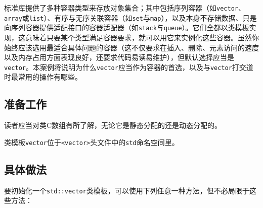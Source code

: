 
标准库提供了多种容器类型来存放对象集合；其中包括序列容器（如\texttt{vector}、\texttt{array}或\texttt{list}）、有序与无序关联容器（如\texttt{set}与\texttt{map}），以及本身不存储数据、只是向序列容器提供适配接口的容器适配器（如\texttt{stack}与\texttt{queue}）。它们全都以类模板实现，这意味着只要某个类型满足容器要求，就可以用它来实例化这些容器。虽然你始终应该选用最适合具体问题的容器（这不仅要求在插入、删除、元素访问的速度以及内存占用方面表现良好，还要求代码易读易维护），但默认选择应当是\texttt{vector}。本案例将说明为什么\texttt{vector}应当作为容器的首选，以及与\texttt{vector}打交道时最常用的操作有哪些。



\subsection{准备工作}



读者应当对类C数组有所了解，无论它是静态分配的还是动态分配的。



类模板\texttt{vector}位于\texttt{<\allowbreak{}vector>}头文件中的\texttt{std}命名空间里。



\subsection{具体做法}



要初始化一个\texttt{std::\allowbreak{}vector}类模板，可以使用下列任意一种方法，但不必局限于这些方法：



